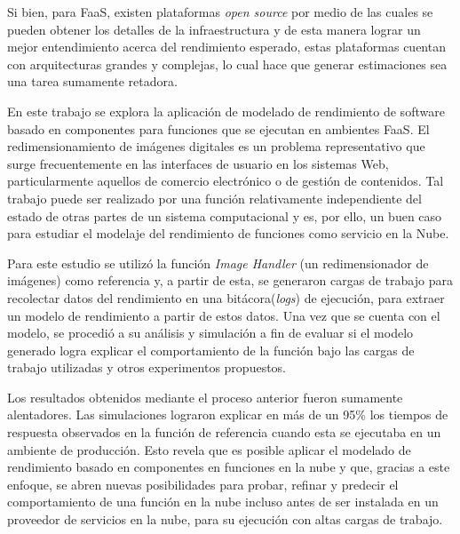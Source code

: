 Si bien, para FaaS, existen plataformas \textit{open source} por medio de las cuales se pueden obtener los detalles de la infraestructura y de esta manera lograr un mejor entendimiento acerca del rendimiento esperado, estas plataformas cuentan con arquitecturas grandes y complejas, lo cual hace que generar estimaciones sea una tarea sumamente retadora.

En este trabajo se explora la aplicación de modelado de rendimiento de software basado en componentes para funciones que se ejecutan en ambientes FaaS. El redimensionamiento de imágenes digitales es un problema representativo que surge frecuentemente en las interfaces de usuario en los sistemas Web, particularmente aquellos de comercio electrónico o de gestión de contenidos. Tal trabajo puede ser realizado por una función relativamente independiente del estado de otras partes de un sistema computacional y es, por ello, un buen caso para estudiar el modelaje del rendimiento de funciones como servicio en la Nube.  

Para este estudio se utilizó la función \emph{Image Handler} (un redimensionador de imágenes) como referencia y, a partir de esta, se generaron cargas de trabajo para recolectar datos del rendimiento en una bitácora(\textit{logs}) de ejecución, para extraer un modelo de rendimiento a partir de estos datos. Una vez que se cuenta con el modelo, se procedió a su análisis y simulación a fin de evaluar si el modelo generado logra explicar el comportamiento de la función bajo las cargas de trabajo utilizadas y otros experimentos propuestos.

Los resultados obtenidos mediante el proceso anterior fueron sumamente alentadores. Las simulaciones lograron explicar en más de un 95\% los tiempos de respuesta observados en la función de referencia cuando esta se ejecutaba en un ambiente de producción. Esto revela que es posible aplicar el modelado de rendimiento basado en componentes en funciones en la nube y que, gracias a este enfoque, se abren nuevas posibilidades para probar, refinar y predecir el comportamiento de una función en la nube incluso antes de ser instalada en un proveedor de servicios en la nube, para su ejecución con altas cargas de trabajo.

